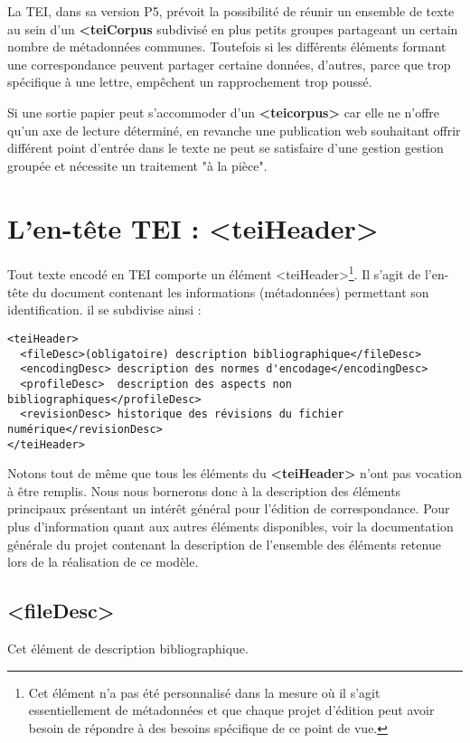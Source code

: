\documentclass[18pt,a4paper,oneside]{book} %
\begin{document}
La TEI, dans sa version P5, prévoit la possibilité de réunir un ensemble de texte au sein d'un \textbf{<teiCorpus} subdivisé en plus petits groupes partageant un certain nombre de métadonnées communes. Toutefois si les différents éléments formant une correspondance peuvent partager certaine données, d'autres, parce que trop spécifique à une lettre, empêchent un rapprochement trop poussé.

Si une sortie papier peut s'accommoder d'un \textbf{<teicorpus>} car elle ne n'offre qu'un axe de lecture déterminé, en revanche une publication web souhaitant offrir différent point d'entrée dans le texte ne peut se satisfaire d'une gestion gestion groupée et nécessite un traitement "à la pièce".

\chapter{L'en-tête TEI : <teiHeader>} 

Tout texte encodé en TEI comporte un élément <teiHeader>\footnote{Cet élément n'a pas été personnalisé dans la mesure où il s'agit essentiellement de métadonnées et que chaque projet d'édition peut avoir besoin de répondre à des besoins spécifique de ce point de vue.}. Il s'agit de l'en-tête du document contenant les informations (métadonnées) permettant son identification. il se subdivise ainsi : 
\bigskip 

\begin{lstlisting}
<teiHeader>
  <fileDesc>(obligatoire) description bibliographique</fileDesc>
  <encodingDesc> description des normes d'encodage</encodingDesc>
  <profileDesc>  description des aspects non bibliographiques</profileDesc>
  <revisionDesc> historique des révisions du fichier numérique</revisionDesc>
</teiHeader>
\end{lstlisting}
\bigskip 
Notons tout de même que tous les éléments du \textbf{<teiHeader>} n'ont pas vocation à être remplis. Nous nous bornerons donc à la description des éléments principaux présentant un intérêt général pour l'édition de correspondance. Pour plus d'information quant aux autres éléments disponibles, voir la documentation générale du projet contenant la description de l'ensemble des éléments retenue lors de la réalisation de ce modèle.

\section{<fileDesc>}

Cet élément de description bibliographique.
\end{document}

